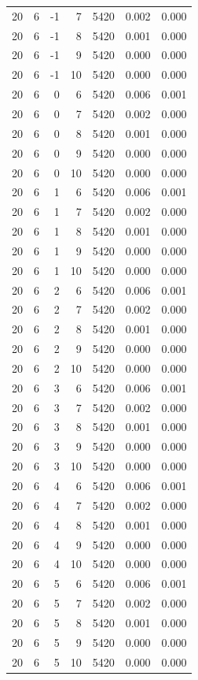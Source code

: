 \begin{table}
\begin{tabular}{rrrrrrr}
20 & 6 & -1 & 7 & 5420 & 0.002 & 0.000 \\
20 & 6 & -1 & 8 & 5420 & 0.001 & 0.000 \\
20 & 6 & -1 & 9 & 5420 & 0.000 & 0.000 \\
20 & 6 & -1 & 10 & 5420 & 0.000 & 0.000 \\
20 & 6 & 0 & 6 & 5420 & 0.006 & 0.001 \\
20 & 6 & 0 & 7 & 5420 & 0.002 & 0.000 \\
20 & 6 & 0 & 8 & 5420 & 0.001 & 0.000 \\
20 & 6 & 0 & 9 & 5420 & 0.000 & 0.000 \\
20 & 6 & 0 & 10 & 5420 & 0.000 & 0.000 \\
20 & 6 & 1 & 6 & 5420 & 0.006 & 0.001 \\
20 & 6 & 1 & 7 & 5420 & 0.002 & 0.000 \\
20 & 6 & 1 & 8 & 5420 & 0.001 & 0.000 \\
20 & 6 & 1 & 9 & 5420 & 0.000 & 0.000 \\
20 & 6 & 1 & 10 & 5420 & 0.000 & 0.000 \\
20 & 6 & 2 & 6 & 5420 & 0.006 & 0.001 \\
20 & 6 & 2 & 7 & 5420 & 0.002 & 0.000 \\
20 & 6 & 2 & 8 & 5420 & 0.001 & 0.000 \\
20 & 6 & 2 & 9 & 5420 & 0.000 & 0.000 \\
20 & 6 & 2 & 10 & 5420 & 0.000 & 0.000 \\
20 & 6 & 3 & 6 & 5420 & 0.006 & 0.001 \\
20 & 6 & 3 & 7 & 5420 & 0.002 & 0.000 \\
20 & 6 & 3 & 8 & 5420 & 0.001 & 0.000 \\
20 & 6 & 3 & 9 & 5420 & 0.000 & 0.000 \\
20 & 6 & 3 & 10 & 5420 & 0.000 & 0.000 \\
20 & 6 & 4 & 6 & 5420 & 0.006 & 0.001 \\
20 & 6 & 4 & 7 & 5420 & 0.002 & 0.000 \\
20 & 6 & 4 & 8 & 5420 & 0.001 & 0.000 \\
20 & 6 & 4 & 9 & 5420 & 0.000 & 0.000 \\
20 & 6 & 4 & 10 & 5420 & 0.000 & 0.000 \\
20 & 6 & 5 & 6 & 5420 & 0.006 & 0.001 \\
20 & 6 & 5 & 7 & 5420 & 0.002 & 0.000 \\
20 & 6 & 5 & 8 & 5420 & 0.001 & 0.000 \\
20 & 6 & 5 & 9 & 5420 & 0.000 & 0.000 \\
20 & 6 & 5 & 10 & 5420 & 0.000 & 0.000 \\
\bottomrule
\end{tabular}
\end{table}
